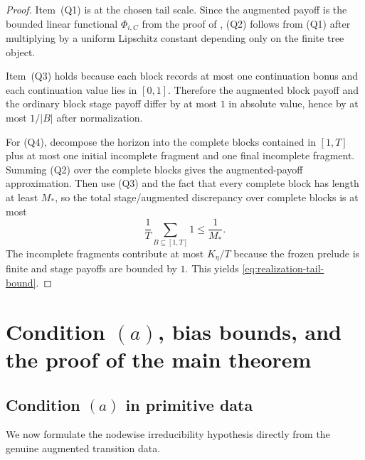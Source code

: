 \documentclass[12pt]{article}
\theoremstyle{definition}
\newcommand{\1}{\mathbf{1}}
\begin{document}
\begin{proof}
Item~(Q1) is  at the chosen tail scale. Since the
augmented payoff is the bounded linear functional $\Phi_{i,C}$ from the proof of
, (Q2) follows from (Q1) after multiplying by a
uniform Lipschitz constant depending only on the finite tree object.

Item~(Q3) holds because each block records at most one continuation bonus and each
continuation value lies in $[0,1]$. Therefore the augmented block payoff and the
ordinary block stage payoff differ by at most $1$ in absolute value, hence by at
most $1/|B|$ after normalization.

For (Q4), decompose the horizon into the complete blocks contained in $[1,T]$ plus
at most one initial incomplete fragment and one final incomplete fragment. Summing
(Q2) over the complete blocks gives the augmented-payoff approximation. Then use
(Q3) and the fact that every complete block has length at least $M_*$, so the
total stage/augmented discrepancy over complete blocks is at most
\[
\frac1T\sum_{B\subseteq[1,T]} 1
\le \frac1{M_*}.
\]
The incomplete fragments contribute at most $K_\eta/T$ because the frozen prelude
is finite and stage payoffs are bounded by $1$. This yields
\eqref{eq:realization-tail-bound}.
\end{proof}

\section{Condition \texorpdfstring{$(a)$}{(a)}, bias bounds, and the proof of the main theorem}
\label{sec:proof-main}

\subsection{Condition \texorpdfstring{$(a)$}{(a)} in primitive data}

We now formulate the nodewise irreducibility hypothesis directly from the genuine
augmented transition data.
\end{document}
